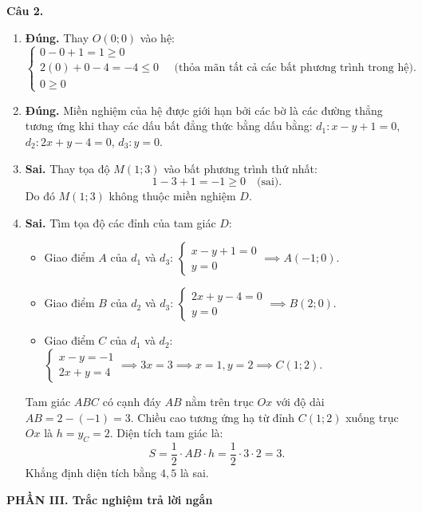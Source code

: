 \documentclass[12pt,a4paper]{article}
\begin{document}
\textbf{Câu 2.}
\begin{enumerate}
    \item \textbf{Đúng.} Thay $O(0; 0)$ vào hệ:
    \[
    \begin{cases}
    0 - 0 + 1 = 1 \ge 0 \\
    2(0) + 0 - 4 = -4 \le 0 \\
    0 \ge 0
    \end{cases}
    \quad \text{(thỏa mãn tất cả các bất phương trình trong hệ)}.
    \]
    \item \textbf{Đúng.} Miền nghiệm của hệ được giới hạn bởi các bờ là các đường thẳng tương ứng khi thay các dấu bất đẳng thức bằng dấu bằng: $d_1\colon x - y + 1 = 0$, $d_2\colon 2x + y - 4 = 0$, $d_3\colon y = 0$.
    \item \textbf{Sai.} Thay tọa độ $M(1; 3)$ vào bất phương trình thứ nhất:
    \[
    1 - 3 + 1 = -1 \ge 0 \quad \text{(sai)}.
    \]
    Do đó $M(1; 3)$ không thuộc miền nghiệm $D$.
    \item \textbf{Sai.} Tìm tọa độ các đỉnh của tam giác $D$:
    \begin{itemize}[leftmargin=0.5cm, itemsep=1pt, topsep=1pt]
        \item Giao điểm $A$ của $d_1$ và $d_3$: $\begin{cases} x - y + 1 = 0 \\ y = 0 \end{cases} \implies A(-1; 0)$.
        \item Giao điểm $B$ của $d_2$ và $d_3$: $\begin{cases} 2x + y - 4 = 0 \\ y = 0 \end{cases} \implies B(2; 0)$.
        \item Giao điểm $C$ của $d_1$ và $d_2$: $\begin{cases} x - y = -1 \\ 2x + y = 4 \end{cases} \implies 3x = 3 \implies x = 1, y = 2 \implies C(1; 2)$.
    \end{itemize}
    Tam giác $ABC$ có cạnh đáy $AB$ nằm trên trục $Ox$ với độ dài $AB = 2 - (-1) = 3$.
    Chiều cao tương ứng hạ từ đỉnh $C(1; 2)$ xuống trục $Ox$ là $h = y_C = 2$.
    Diện tích tam giác là:
    \[
    S = \dfrac{1}{2} \cdot AB \cdot h = \dfrac{1}{2} \cdot 3 \cdot 2 = 3.
    \]
    Khẳng định diện tích bằng $4{,}5$ là sai.
\end{enumerate}

\vspace{0.2cm}
\textbf{\large PHẦN III. Trắc nghiệm trả lời ngắn}
\end{document}
